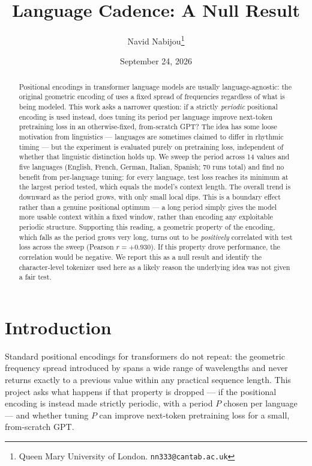 \documentclass[11pt]{article}
\title{Language Cadence: A Null Result}
\author{Navid Nabijou\thanks{Queen Mary University of London. \texttt{nn333@cantab.ac.uk}}}
\date{September 24, 2026}
\begin{document}
\maketitle

\begin{abstract}
Positional encodings in transformer language models are usually language-agnostic: the original geometric encoding of \citet{vaswani2017attention} uses a fixed spread of frequencies regardless of what is being modeled. This work asks a narrower question: if a strictly \emph{periodic} positional encoding is used instead, does tuning its period per language improve next-token pretraining loss in an otherwise-fixed, from-scratch GPT? The idea has some loose motivation from linguistics --- languages are sometimes claimed to differ in rhythmic timing --- but the experiment is evaluated purely on pretraining loss, independent of whether that linguistic distinction holds up. We sweep the period across 14 values and five languages (English, French, German, Italian, Spanish; 70 runs total) and find no benefit from per-language tuning: for every language, test loss reaches its minimum at the largest period tested, which equals the model's context length. The overall trend is downward as the period grows, with only small local dips. This is a boundary effect rather than a genuine positional optimum --- a long period simply gives the model more usable context within a fixed window, rather than encoding any exploitable periodic structure. Supporting this reading, a geometric property of the encoding, which falls as the period grows very long, turns out to be \emph{positively} correlated with test loss across the sweep (Pearson $r = +0.930$). If this property drove performance, the correlation would be negative. We report this as a null result and identify the character-level tokenizer used here as a likely reason the underlying idea was not given a fair test.
\end{abstract}

\section{Introduction}

Standard positional encodings for transformers do not repeat: the geometric frequency spread introduced by \citet{vaswani2017attention} spans a wide range of wavelengths and never returns exactly to a previous value within any practical sequence length. This project asks what happens if that property is dropped --- if the positional encoding is instead made strictly periodic, with a period $P$ chosen per language --- and whether tuning $P$ can improve next-token pretraining loss for a small, from-scratch GPT.
\end{document}
